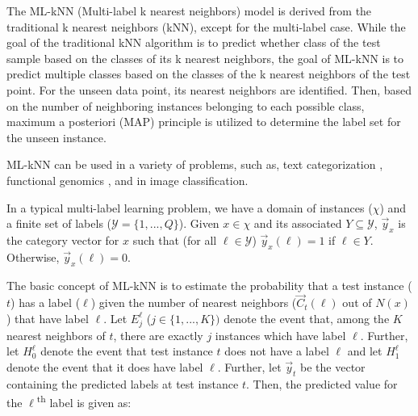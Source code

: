 \documentclass[11pt]{article}
\begin{document}
The ML-kNN (Multi-label k nearest neighbors) model is derived from the traditional k nearest neighbors (kNN), except for the multi-label case. While the goal of the traditional kNN algorithm is to predict whether class of the test sample based on the classes of its k nearest neighbors, the goal of ML-kNN is to predict multiple classes based on the classes of the k nearest neighbors of the test point. For the unseen data point, its nearest neighbors are identified. Then, based on the number of neighboring instances belonging to each possible class, maximum a posteriori (MAP) principle is utilized to determine the label set for the unseen instance. 


ML-kNN can be used in a variety of problems, such as, text categorization \autocite{McCallum99multi-labeltext}, functional genomics \autocite{KernelMulti-labelClassification}, and in image classification.\autocite{Boutell04learningmulti-label}

In a typical multi-label learning problem, we have a domain of instances ($\chi$)  and a finite set of labels ($\mathcal{Y} = \{1,...,Q\}$). Given $x \in \chi$ and its associated $Y \subseteq \mathcal{Y}$, $\vec{y}_x$ is the category vector for $x$ such that (for all $\ell \in \mathcal{Y}$) $\vec{y}_x(\ell) = 1$ if $\ell \in Y$. Otherwise, $\vec{y}_x(\ell) = 0$. 

The basic concept of ML-kNN is to estimate the probability that a test instance ($t$) has a label ($\ell$) given the number of nearest neighbors ($\vec{C}_t(\ell)$ out of $N(x)$) that have label $\ell$. Let $E_j^\ell$ ($j \in \{1,...,K\})$ denote the event that, among the $K$ nearest neighbors of $t$, there are exactly $j$ instances which have label $\ell$. Further, let $H_0^\ell$ denote the event that test instance $t$ does not have a label $\ell$ and let $H_1^\ell$ denote the event that it does have label $\ell$. 
Further, let $\vec{y}_t$ be the vector containing the predicted labels at test instance $t$. Then, the predicted value for the $\ell$\textsuperscript{th} label is given as:
\end{document}
